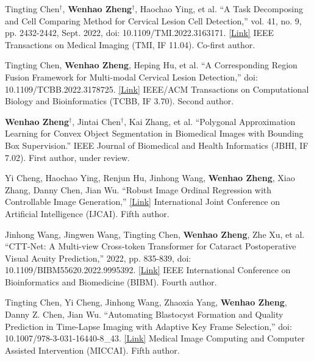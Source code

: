 
\begin{cventries}

    \cventry
    {Tingting Chen$^\dagger$, \textbf{Wenhao Zheng$^\dagger$}, Haochao Ying, et al. ``A Task Decomposing and Cell Comparing Method for Cervical Lesion Cell Detection,'' vol. 41, no. 9, pp. 2432-2442, Sept. 2022, doi: 10.1109/TMI.2022.3163171. \href{https://ieeexplore.ieee.org/document/9744114}{\textcolor{link}{[Link]}}}
    {IEEE Transactions on Medical Imaging (TMI, IF 11.04). Co-first author.}
    {\ } %
    {} %
    {
    }

    \cventry
    {Tingting Chen, \textbf{Wenhao Zheng}, Heping Hu, et al. ``A Corresponding Region Fusion Framework for Multi-modal Cervical Lesion Detection,'' doi: 10.1109/TCBB.2022.3178725. \href{https://ieeexplore.ieee.org/document/9784879}{\textcolor{link}{[Link]}}}
    {IEEE/ACM Transactions on Computational Biology and Bioinformatics (TCBB, IF 3.70). Second author.}
    {\ } %
    {} %
    {}

    \cventry
    {\textbf{Wenhao Zheng$^\dagger$}, Jintai Chen$^\dagger$, Kai Zhang, et al. ``Polygonal Approximation Learning for Convex Object Segmentation in Biomedical Images with Bounding Box Supervision.''}
    {IEEE Journal of Biomedical and Health Informatics (JBHI, IF 7.02). First author, under review.}
    {\ } %
    {} %
    {}

    \cventry
    {Yi Cheng, Haochao Ying, Renjun Hu, Jinhong Wang, \textbf{Wenhao Zheng}, Xiao Zhang, Danny Chen, Jian Wu. ``Robust Image Ordinal Regression with Controllable Image Generation,'' \href{https://arxiv.org/abs/2305.04213}{\textcolor{link}{[Link]}}}
    {International Joint Conference on Artificial Intelligence (IJCAI). Fifth author.}
    {\ } %
    {} %
    {}

    \cventry
    {Jinhong Wang, Jingwen Wang, Tingting Chen, \textbf{Wenhao Zheng}, Zhe Xu, et al. ``CTT-Net: A Multi-view Cross-token Transformer for Cataract Postoperative Visual Acuity Prediction,'' 2022, pp. 835-839, doi: 10.1109/BIBM55620.2022.9995392. \href{https://ieeexplore.ieee.org/document/9995392}{\textcolor{link}{[Link]}}}
    {IEEE International Conference on Bioinformatics and Biomedicine (BIBM). Fourth author.}
    {\ } %
    {} %
    {}

    \cventry
    {Tingting Chen, Yi Cheng, Jinhong Wang, Zhaoxia Yang, \textbf{Wenhao Zheng}, Danny Z. Chen, Jian Wu. ``Automating Blastocyst Formation and Quality Prediction in Time-Lapse Imaging with Adaptive Key Frame Selection,'' doi: 10.1007/978-3-031-16440-8\_43. \href{https://link.springer.com/chapter/10.1007/978-3-031-16440-8_43}{\textcolor{link}{[Link]}}}
    {Medical Image Computing and Computer Assisted Intervention (MICCAI). Fifth author.}
    {\ } %
    {} %
    {}
\end{cventries}
